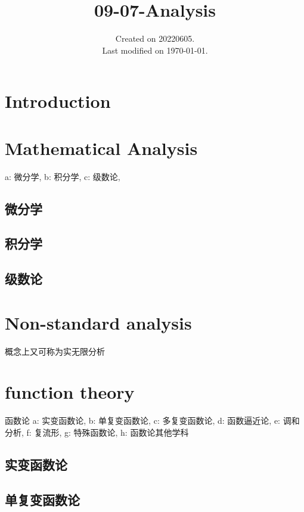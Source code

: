 \documentclass[UTF8]{../09-Mathematics}
\begin{document}
\title{09-07-Analysis}
\date{Created on 20220605.\\   Last modified on \today.}
\maketitle
\tableofcontents


\chapter{Introduction}




\chapter{Mathematical Analysis}
a: 微分学, 
b: 积分学, 
c: 级数论,

\section{微分学}
\section{积分学}
\section{级数论}



\chapter{Non-standard analysis}

概念上又可称为实无限分析



\chapter{function theory}
函数论
a: 实变函数论, 
b: 单复变函数论, 
c: 多复变函数论, 
d: 函数逼近论, 
e: 调和分析, 
f: 复流形, 
g: 特殊函数论, 
h: 函数论其他学科

\section{实变函数论}
\section{单复变函数论}
\end{document}
